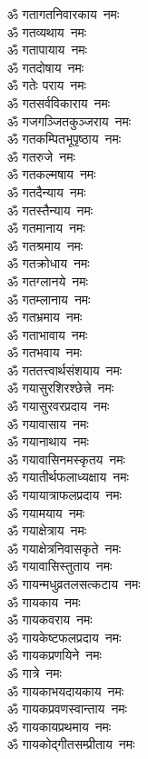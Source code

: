 \begin{multicols}{2}
\begin{flushleft}
ॐ गतागतनिवारकाय~नमः\\
ॐ गतव्यथाय~नमः\\
ॐ गतापायाय~नमः\\
ॐ गतदोषाय~नमः\\
ॐ गतेः पराय~नमः\hfill{}\\
ॐ गतसर्वविकाराय~नमः\\
ॐ गजगञ्जितकुञ्जराय~नमः\\
ॐ गतकम्पितभूपृष्ठाय~नमः\\
ॐ गतरुजे~नमः\\
ॐ गतकल्मषाय~नमः\\
ॐ गतदैन्याय~नमः\\
ॐ गतस्तैन्याय~नमः\\
ॐ गतमानाय~नमः\\
ॐ गतश्रमाय~नमः\\
ॐ गतक्रोधाय~नमः\hfill{}\\
ॐ गतग्लानये~नमः\\
ॐ गतम्लानाय~नमः\\
ॐ गतभ्रमाय~नमः\\
ॐ गताभावाय~नमः\\
ॐ गतभवाय~नमः\\
ॐ गततत्त्वार्थसंशयाय~नमः\\
ॐ गयासुरशिरश्छेत्त्रे~नमः\\
ॐ गयासुरवरप्रदाय~नमः\\
ॐ गयावासाय~नमः\\
ॐ गयानाथाय~नमः\hfill{}\\
ॐ गयावासिनमस्कृतय~नमः\\
ॐ गयातीर्थफलाध्यक्षाय~नमः\\
ॐ गयायात्राफलप्रदाय~नमः\\
ॐ गयामयाय~नमः\\
ॐ गयाक्षेत्राय~नमः\\
ॐ गयाक्षेत्रनिवासकृते~नमः\\
ॐ गयावासिस्तुताय~नमः\\
ॐ गायन्मधुव्रतलसत्कटाय~नमः\\
ॐ गायकाय~नमः\\
ॐ गायकवराय~नमः\hfill{}\\
ॐ गायकेष्टफलप्रदाय~नमः\\
ॐ गायकप्रणयिने~नमः\\
ॐ गात्रे~नमः\\
ॐ गायकाभयदायकाय~नमः\\
ॐ गायकप्रवणस्वान्ताय~नमः\\
ॐ गायकायप्रथमाय~नमः\\
ॐ गायकोद्गीतसम्प्रीताय~नमः\\

\end{flushleft}
\end{multicols}
